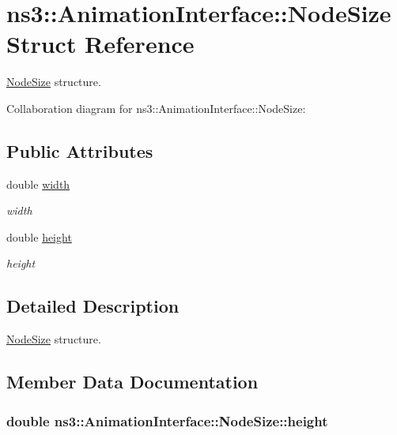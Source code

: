 \hypertarget{structns3_1_1AnimationInterface_1_1NodeSize}{}\section{ns3\+:\+:Animation\+Interface\+:\+:Node\+Size Struct Reference}
\label{structns3_1_1AnimationInterface_1_1NodeSize}


\hyperlink{structns3_1_1AnimationInterface_1_1NodeSize}{Node\+Size} structure.  




Collaboration diagram for ns3\+:\+:Animation\+Interface\+:\+:Node\+Size\+:
\subsection*{Public Attributes}
\begin{DoxyCompactItemize}
\item 
double \hyperlink{structns3_1_1AnimationInterface_1_1NodeSize_a03c08b24f4fc9fb297e8e12a30cc9b64}{width}
\begin{DoxyCompactList}\small\item\em width \end{DoxyCompactList}\item 
double \hyperlink{structns3_1_1AnimationInterface_1_1NodeSize_a66026a33f1c7cb22bc9c66645fbb025a}{height}
\begin{DoxyCompactList}\small\item\em height \end{DoxyCompactList}\end{DoxyCompactItemize}


\subsection{Detailed Description}
\hyperlink{structns3_1_1AnimationInterface_1_1NodeSize}{Node\+Size} structure. 

\subsection{Member Data Documentation}
\subsubsection[{\texorpdfstring{height}{height}}]{\setlength{\rightskip}{0pt plus 5cm}double ns3\+::\+Animation\+Interface\+::\+Node\+Size\+::height}\hypertarget{structns3_1_1AnimationInterface_1_1NodeSize_a66026a33f1c7cb22bc9c66645fbb025a}{}\label{structns3_1_1AnimationInterface_1_1NodeSize_a66026a33f1c7cb22bc9c66645fbb025a}


